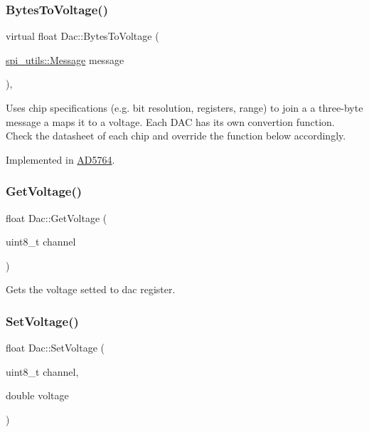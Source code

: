\subsubsection{\texorpdfstring{Bytes\+To\+Voltage()}{BytesToVoltage()}}
{\footnotesize\ttfamily virtual float Dac\+::\+Bytes\+To\+Voltage (\begin{DoxyParamCaption}\item[{\mbox{\hyperlink{structspi__utils_1_1Message}{spi\+\_\+utils\+::\+Message}}}]{message }\end{DoxyParamCaption})\hspace{0.3cm}{\ttfamily [protected]}, {}}

Uses chip specifications (e.\+g. bit resolution, registers, range) to join a a three-\/byte message a maps it to a voltage. Each D\+AC has its own convertion function. Check the datasheet of each chip and override the function below accordingly. 

Implemented in \mbox{\hyperlink{classAD5764_ab2c3e35cc2dba24a54e4facf2910d6d7}{A\+D5764}}.

\mbox{\label{classDac_a55688546d527c42ebf48a12204e69731}} 
\subsubsection{\texorpdfstring{Get\+Voltage()}{GetVoltage()}}
{\footnotesize\ttfamily float Dac\+::\+Get\+Voltage (\begin{DoxyParamCaption}\item[{uint8\+\_\+t}]{channel }\end{DoxyParamCaption})}

Gets the voltage setted to dac register. \mbox{\label{classDac_a905acd38131fe25a04aeace0bcf1ba30}} 
\subsubsection{\texorpdfstring{Set\+Voltage()}{SetVoltage()}}
{\footnotesize\ttfamily float Dac\+::\+Set\+Voltage (\begin{DoxyParamCaption}\item[{uint8\+\_\+t}]{channel,  }\item[{double}]{voltage }\end{DoxyParamCaption})}

